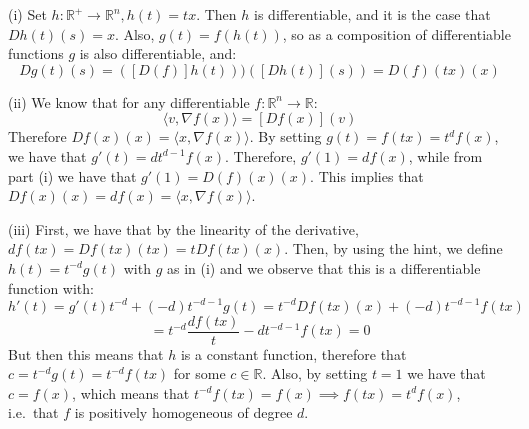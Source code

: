 \begin{solution}

    (i) Set $h: \mathbb{R}^{+} \rightarrow \mathbb{R}^n, h(t) = tx$.
    Then $h$ is differentiable, and it is the case that $Dh(t)(s) = x$.
    Also, $g(t) = f(h(t))$, so as a composition of differentiable functions $g$ is also differentiable, and:
    $$Dg(t)(s) = ([D(f)]h(t)))([Dh(t)](s)) = D(f)(tx)(x)$$

    (ii) We know that for any differentiable $f: \mathbb{R}^n \rightarrow \mathbb{R}$:
    $$\langle v, \nabla f(x) \rangle = [D f(x)](v)$$
    Therefore $Df(x)(x) = \langle x, \nabla f(x) \rangle$.
    By setting $g(t) = f(tx) = t^df(x)$, we have that $g'(t) = dt^{d-1}f(x)$.
    Therefore, $g'(1) = df(x)$, while from part (i) we have that $g'(1) =  D(f)(x)(x)$.
    This implies that $Df(x)(x) = d f(x) = \langle x, \nabla f(x) \rangle$.

    (iii) First, we have that by the linearity of the derivative, $df(tx) = Df(tx)(tx) = t Df(tx)(x)$.
    Then, by using the hint, we define $h(t) = t^{-d}g(t)$ with $g$ as in (i) and we observe that this is a differentiable function with:
    $$h'(t) = g'(t)t^{-d} + (-d)t^{-d-1}g(t) = t^{-d}Df(tx)(x) + (-d)t^{-d-1}f(tx)$$
    $$ = t^{-d}\frac{df(tx)}{t} - dt^{-d-1}f(tx) = 0$$
    But then this means that $h$ is a constant function, therefore that $c = t^{-d}g(t) = t^{-d}f(tx)$ for some $c \in \mathbb{R}$. 
    Also, by setting $t = 1$ we have that $c = f(x)$, which means that $t^{-d}f(tx) = f(x) \implies f(tx) = t^{d}f(x)$, i.e.\ that $f$ is positively homogeneous of degree $d$.
    
\end{solution}

\newpage

